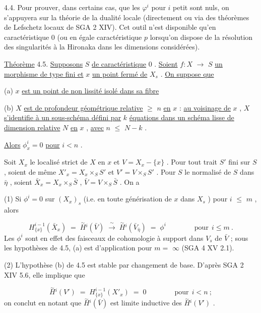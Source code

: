 4.4.  Pour prouver, dans certains cas, que les  $\varphi^i$  pour  $i$  petit sont nuls, on s'appuyera sur la théorie de la dualité locale (directement ou via des théorèmes de Lefschetz locaux de SGA 2 XIV). Cet outil n'est disponible qu'en caractéristique 0 (ou en égale caractéristique  $p$ lorsqu'on dispose de la résolution des singularités à la Hironaka dans les dimensions considérées).



\underline{Théorème} 4.5.  \underline{Supposons}  $S$  \underline{de caractéristique} 0 . \underline{Soient}  $f : X$ $\longrightarrow$ $S$  \underline{un morphisme de type fini et}  $x$  \underline{un point fermé de}  $X_s$ . \underline{On suppose que}

(a) $x$  \underline{est un point de non lissité isolé dans sa fibre}

(b) $X$  \underline{est de profondeur géométrique relative} $\geqslant$ $n$ \underline{en}  $x$ : \underline{au voisinage de} $x$ , $X$ \underline{s'identifie à un sous-schéma défini par} $k$ \underline{équations dans un schéma lisse de dimension relative} $N$ \underline{en} $x$ , \underline{avec}  $n$ $\leqslant$ $N-k$ .

\underline{Alors}  $\phi^i_x = 0$  \underline{pour}  $i < n$ .

Soit  $X_x$  le localisé strict de  $X$  en  $x$  et  $V = X_x - \{x\}$  . Pour tout trait  $S'$  fini sur  $S$ , soient de même  $X'_x = X_x \times_S S'$  et  $V' = V \times_S S'$ . Pour  $S$  le normalisé de  $S$  dans  $\bar{\eta}$ , soient  $\bar{X}_x = X_x \times_S \bar{S}$ ,  $\bar{V} = V \times_S \bar{S}$ . On a

(1) Si $\phi^i = 0$  sur  $(X_x)_s$  (i.e. en toute générisation de  $x$  dans  $X_s$ ) pour $i$ $\leqslant$ $m$ , alors

\begin{equation*}
H^{i-1}_{\{x\}}(\bar{X}_x) \;=\; \overset{\sim}{H}{}^{i}(\bar{V}) \;\xrightarrow{\ \sim\ }\; \overset{\sim}{H}{}^{i}(\bar{V}_{\bar{\eta}}) \;=\; \phi^i \qquad\qquad \text{pour}\ \ i \leqslant m\ .
\end{equation*}
Les  $\phi^i$  sont en effet des faisceaux de cohomologie à support dans  $V_s$  de  $\bar{V}$ ; sous les hypothèses de 4.5, (a) est d'application pour  $m =$ $\infty$   (SGA 4 XV 2.1).

(2) L'hypothèse (b) de 4.5 est stable par changement de base. D'après SGA 2 XIV 5.6, elle implique que

\begin{equation*}
\overset{\sim}{H}{}^{i}(V') \;=\; H^{i-1}_{\{x\}}(X'_x) \;=\; 0 \qquad\qquad \text{pour}\ \ i < n\ ;
\end{equation*}
on conclut en notant que  $\overset{\sim}{H}{}^{i}(\bar{V})$  est limite inductive des  $\overset{\sim}{H}{}^{i}(V')$  .


